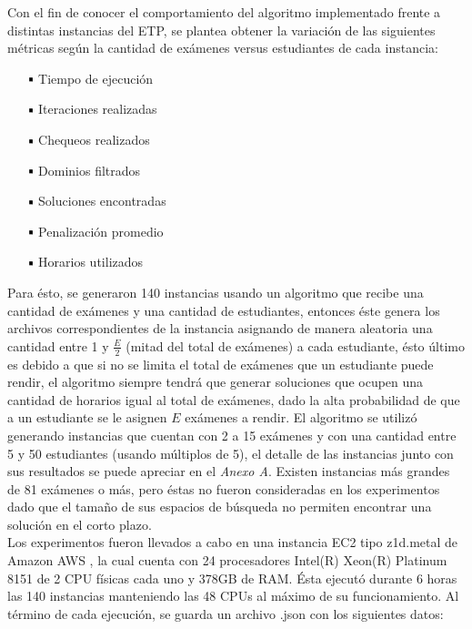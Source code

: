 \documentclass[letter, 10pt]{article}
\newcommand*\sq{\mathbin{\vcenter{\hbox{\rule{.7ex}{.7ex}}}}}
\begin{document}
Con el fin de conocer el comportamiento del algoritmo implementado frente a distintas instancias del ETP, se plantea obtener la variación de las siguientes métricas según la cantidad de exámenes versus estudiantes de cada instancia:

\begin{itemize}
	\item[$\sq$] Tiempo de ejecución
	\item[$\sq$] Iteraciones realizadas
	\item[$\sq$] Chequeos realizados
	\item[$\sq$] Dominios filtrados
	\item[$\sq$] Soluciones encontradas
	\item[$\sq$] Penalización promedio
	\item[$\sq$] Horarios utilizados
\end{itemize}

Para ésto, se generaron 140 instancias usando un algoritmo que recibe una cantidad de exámenes y una cantidad de estudiantes, entonces éste genera los archivos correspondientes de la instancia asignando de manera aleatoria una cantidad entre 1 y $\frac{E}{2}$ (mitad del total de exámenes) a cada estudiante, ésto último es debido a que si no se limita el total de exámenes que un estudiante puede rendir, el algoritmo siempre tendrá que generar soluciones que ocupen una cantidad de horarios igual al total de exámenes, dado la alta probabilidad de que a un estudiante se le asignen $E$ exámenes a rendir. El algoritmo se utilizó generando instancias que cuentan con 2 a 15 exámenes y con una cantidad entre 5 y 50 estudiantes (usando múltiplos de 5), el detalle de las instancias junto con sus resultados se puede apreciar en el \textit{Anexo A}. Existen instancias más grandes de 81 exámenes o más, pero éstas no fueron consideradas en los experimentos dado que el tamaño de sus espacios de búsqueda no permiten encontrar una solución en el corto plazo.\\

Los experimentos fueron llevados a cabo en una instancia EC2 tipo z1d.metal de Amazon AWS \cite{aws}, la cual cuenta con 24 procesadores Intel(R) Xeon(R) Platinum 8151 de 2 CPU físicas cada uno y 378GB de RAM. Ésta ejecutó durante 6 horas las 140 instancias manteniendo las 48 CPUs al máximo de su funcionamiento. Al término de cada ejecución, se guarda un archivo .json con los siguientes datos:
\end{document}
